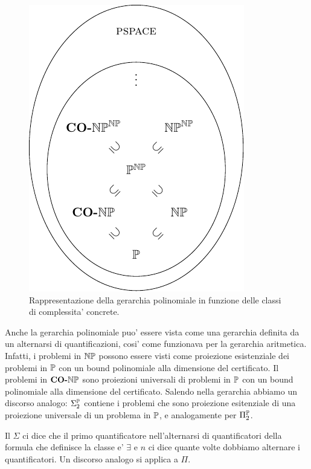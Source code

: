 \begin{figure}[h]
    \begin{center}
        \includegraphics{./img/oracles/PolyHierarchy2.pdf}
        \caption{Rappresentazione della gerarchia polinomiale in funzione delle classi di
        complessita' concrete.}
        \label{img:PolyHierarchy2}
    \end{center}
\end{figure}


Anche la gerarchia polinomiale puo' essere vista come una gerarchia definita da un alternarsi di
quantificazioni, cosi' come funzionava per la gerarchia aritmetica. Infatti, i problemi in
$\mathbb{NP}$ possono essere visti come proiezione esistenziale dei problemi in $\mathbb{P}$ con un bound
polinomiale alla dimensione del certificato. Il problemi in $\textbf{CO-}\mathbb{NP}$ sono proiezioni universali di
problemi in $\mathbb{P}$ con un bound polinomiale alla dimensione del certificato. Salendo nella
gerarchia abbiamo un discorso analogo: $\Sigma_{2}^{\mathbb{P}}$ contiene i problemi che sono
proiezione esitenziale di una proiezione universale di un problema in $\mathbb{P}$, e analogamente per
$\Pi_{2}^{\mathbb{P}}$. 

Il $\Sigma$ ci dice che il primo quantificatore nell'alternarsi di quantificatori della formula che
definisce la classe e' $\exists$ e $n$ ci dice quante volte dobbiamo alternare i quantificatori. Un
discorso analogo si applica a $\Pi$.
